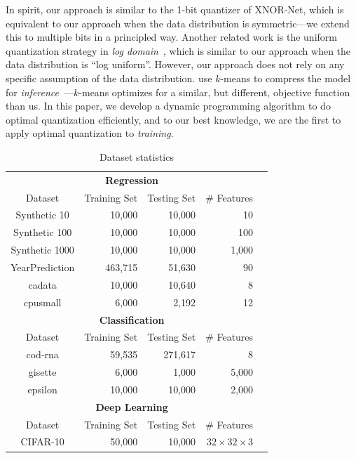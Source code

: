 \documentclass{article}
\begin{document}
In spirit, our approach is similar to the 1-bit quantizer of
XNOR-Net, which is equivalent to our approach when the data
distribution is symmetric---we extend this
to multiple bits in a principled way. Another related work
is the uniform quantization strategy 
in {\em log domain}~\cite{miyashita2016convolutional},
which is similar to our approach when the data distribution
is ``log uniform''. However, our approach does not rely on
any specific assumption of the data distribution.
\citet{Han:2016:ICLR} use $k$-means to
compress the model for {\em inference}~---$k$-means
optimizes for a similar, but different, objective
function than us. In this paper, we 
develop a dynamic
programming algorithm to do optimal quantization efficiently,
and to our best knowledge, we
are the first to apply optimal quantization to
{\em training}.








\begin{table}[t]
\scriptsize
\centering
\begin{tabular}{crrrr}
\hline
\multicolumn{4}{c}{\bf Regression}\\
Dataset           & Training Set & Testing Set & \# Features  \\
\hline
Synthetic 10   & 10,000        & 10,000       & 10               \\
Synthetic 100  & 10,000        & 10,000       & 100              \\
Synthetic 1000 & 10,000        & 10,000       & 1,000           \\
YearPrediction & 463,715       & 51,630       & 90                  \\
cadata         & 10,000        & 10,640       & 8                   \\
cpusmall       & 6,000         & 2,192        & 12     \\
\hline
\hline
\multicolumn{4}{c}{\bf Classification}\\
Dataset           & Training Set & Testing Set & \# Features \\
\hline
cod-rna        & 59,535        & 271,617      & 8    \\
gisette        & 6,000         & 1,000        & 5,000  \\  
epsilon        & 10,000        & 10,000       & 2,000\\  
\hline
\hline
\multicolumn{4}{c}{\bf Deep Learning}\\
Dataset           & Training Set & Testing Set & \# Features \\
\hline
CIFAR-10        & 50,000        & 10,000      &$32\times 32\times 3$     \\
\hline
\end{tabular}
\caption{Dataset statistics}
\label{table:dataset}
\end{table}
\end{document}
